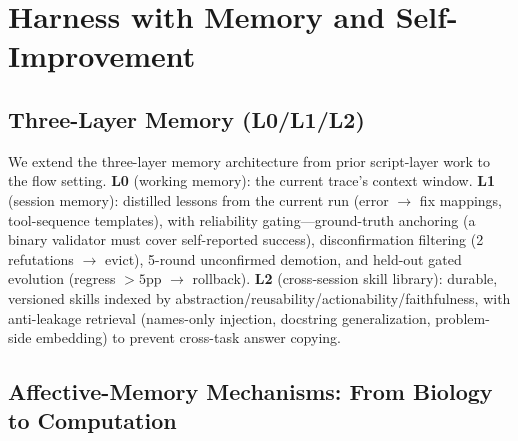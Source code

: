 \section{Harness with Memory and Self-Improvement}
\label{sec:harness}

\subsection{Three-Layer Memory (L0/L1/L2)}
\label{sec:memory-arch}

We extend the three-layer memory architecture from prior script-layer work \cite{liu2026runreadbackrefine} to the flow setting. \textbf{L0} (working memory): the current trace's context window. \textbf{L1} (session memory): distilled lessons from the current run (error $\rightarrow$ fix mappings, tool-sequence templates), with reliability gating---ground-truth anchoring (a binary validator must cover self-reported success), disconfirmation filtering (2 refutations $\rightarrow$ evict), 5-round unconfirmed demotion, and held-out gated evolution (regress $>5$pp $\rightarrow$ rollback). \textbf{L2} (cross-session skill library): durable, versioned skills indexed by abstraction/reusability/actionability/faithfulness, with anti-leakage retrieval (names-only injection, docstring generalization, problem-side embedding) to prevent cross-task answer copying.

\subsection{Affective-Memory Mechanisms: From Biology to Computation}
\label{sec:affective}


